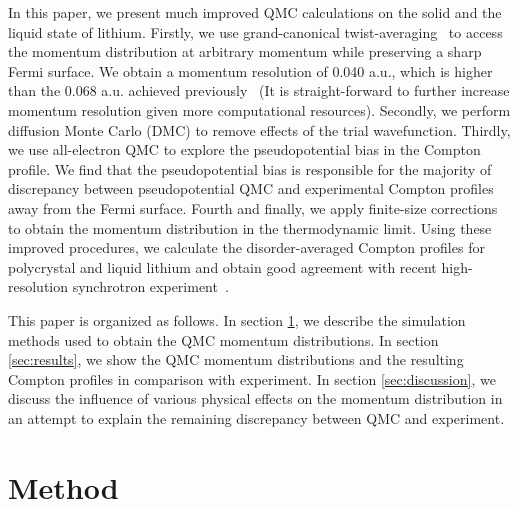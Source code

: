 \documentclass[aps,prb,showpacs,preprintnumbers,amsmath,amssymb,superscriptaddress,twocolumn]{revtex4-1}
\begin{document}
In this paper, we present much improved QMC calculations on the solid and the liquid state of lithium. Firstly, we use grand-canonical twist-averaging~\cite{Lin2001} to access the momentum distribution at arbitrary momentum while preserving a sharp Fermi surface. We obtain a momentum resolution of 0.040 a.u., which is higher than the 0.068 a.u. achieved previously~\cite{Filippi1999} (It is straight-forward to further increase momentum resolution given more computational resources). Secondly, we perform diffusion Monte Carlo (DMC) to remove effects of the trial wavefunction. Thirdly, we use all-electron QMC to explore the pseudopotential bias in the Compton profile. We find that the pseudopotential bias is responsible for the majority of discrepancy between pseudopotential QMC and experimental Compton profiles away from the Fermi surface. Fourth and finally, we apply finite-size corrections~\cite{Holzmann2009,Holzmann2011} to obtain the momentum distribution in the thermodynamic limit. Using these improved procedures, we calculate the disorder-averaged Compton profiles for polycrystal and liquid lithium and obtain good agreement with recent high-resolution synchrotron experiment~\cite{Nozomu2019}.

This paper is organized as follows. In section \ref{sec:method}, we describe the simulation methods used to obtain the QMC momentum distributions. In section \ref{sec:results}, we show the QMC momentum distributions and the resulting Compton profiles in comparison with experiment. In section \ref{sec:discussion}, we discuss the influence of various physical effects on the momentum distribution in an attempt to explain the remaining discrepancy between QMC and experiment.

\section{Method} \label{sec:method}
\end{document}
